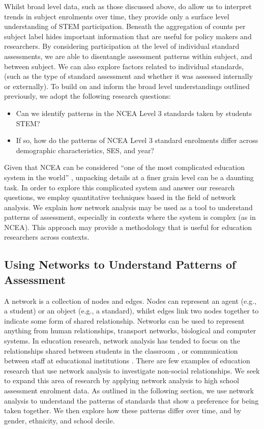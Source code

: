 Whilst broad level data, such as those discussed above, do allow us to interpret trends in subject enrolments over time, they provide only a surface level understanding of STEM participation. Beneath the aggregation of counts per subject label hides important information that are useful for policy makers and researchers. By considering participation at the level of individual standard assessments, we are able to disentangle assessment patterns within subject, and between subject. We can also explore factors related to individual standards, (such as the type of standard assessment and whether it was assessed internally or externally). To build on and inform the broad level understandings outlined previously, we adopt the following research questions:
\begin{itemize}
    \item Can we identify patterns in the NCEA Level 3 standards  taken by students STEM?
    \item If so, how do the patterns of NCEA Level 3 standard enrolments differ across demographic characteristics, SES, and year?
\end{itemize}

Given that NCEA can be considered ``one of the most complicated education system in the world'' \citep{hipkins2016ncea}, unpacking details at a finer grain level can be a daunting task. In order to explore this complicated system and answer our research questions, we employ quantitative techniques based in the field of network analysis. We explain how network analysis may be used as a tool to understand patterns of assessment, especially in contexts where the system is complex (as in NCEA).  This approach may provide a methodology that is useful for education researchers across contexts. 


\subsection{Using Networks to Understand Patterns of Assessment}
A network is a collection of nodes and edges. Nodes can represent an agent (e.g., a student) or an object (e.g., a standard), whilst edges link two nodes together to indicate some form of shared relationship. Networks can be used to represent anything from human relationships, transport networks, biological and computer systems. In education research, network analysis has tended to focus on the relationships shared between students in the classroom \citep{tranmer2014multiple}, or communication between staff at educational institutions \citep{daly2010social}. There are few examples of education research that use network analysis to investigate non-social relationships. We seek to expand this area of research by applying network analysis to high school assessment enrolment data. As outlined in the following section, we use network analysis to understand the patterns of standards that show a preference for being taken together. We then explore how these patterns differ over time, and by gender, ethnicity, and school decile.

